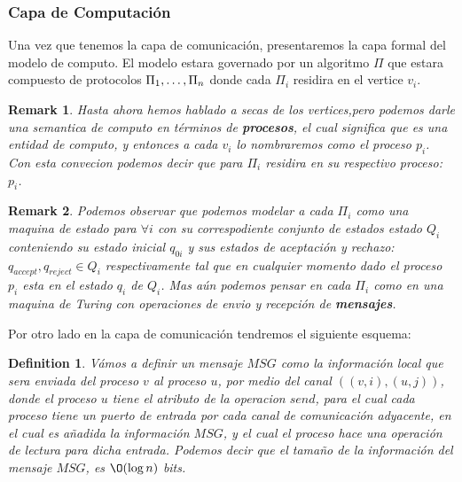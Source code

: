 \documentclass[10pt]{report}
\newtheorem*{remark}{Remark}
\newtheorem{definition}{Definition}
\begin{document}
    \subsubsection{Capa de Computación}
    Una vez que tenemos la capa de comunicación, presentaremos la capa formal del modelo de
    computo.
    El modelo estara governado por un algoritmo $\Pi$ que estara compuesto de protocolos
    $\Pi_{1},\mathellipsis,\Pi_{n}$ donde cada $\Pi_{i}$ residira en el vertice $v_{i}$.
    \newline
    \begin{remark}
        Hasta ahora hemos hablado a secas de los vertices,pero podemos darle una semantica
        de computo en términos de \textbf{procesos}, el cual significa que es una entidad de computo, y entonces a cada $v_{i}$
        lo nombraremos como el proceso $p_{i}$.\newline
        Con esta convecion podemos decir que para $\Pi_{i}$ residira en su respectivo proceso:
        $p_{i}$.

    \end{remark}
    \begin{remark}
        Podemos observar que podemos modelar a cada $\Pi_{i}$ como una maquina de estado para $\forall i$ con su
        correspodiente conjunto de estados estado $Q_{i}$ conteniendo su estado inicial  $q_{0i}$ y sus estados de
        aceptación y rechazo: $q_{accept},q_{reject}\in Q_{i}$ respectivamente tal que en cualquier
        momento dado el proceso $p_{i}$ esta en el estado $q_{i}$ de $Q_{i}$.
        \space
        Mas aún podemos pensar en cada $\Pi_{i}$ como en una maquina de Turing con operaciones de envio y
        recepción de \textbf{mensajes}.
    \end{remark}
    \newline
    Por otro lado en la capa de comunicación tendremos el siguiente esquema:
    \newline
    \begin{definition}
        Vámos a definir un mensaje $MSG$ como la información local que sera enviada del proceso $v$ al proceso $u$,
        por medio del canal $((v,i),(u,j))$, donde el proceso $u$ tiene el atributo de la operacion $send$,\space
        para el cual cada proceso tiene un puerto de entrada por cada
        canal de comunicación adyacente, en el cual es añadida la información $MSG$, y el cual el proceso hace una operación
        de lectura para dicha entrada.
        \newline
        Podemos decir que el tamaño de la información del mensaje $MSG$, es $\O(\log n)$ bits.
    \end{definition}
\end{document}

